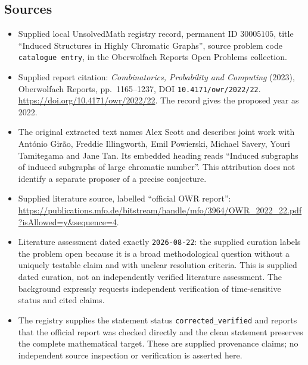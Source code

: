 \documentclass[11pt]{article}
\begin{document}
\subsection{Sources}
\begin{itemize}
\item Supplied local UnsolvedMath registry record, permanent ID \(30005105\), title ``Induced Structures in Highly Chromatic Graphs'', source problem code \texttt{catalogue entry}, in the Oberwolfach Reports Open Problems collection.
\item Supplied report citation: \emph{Combinatorics, Probability and Computing} (2023), Oberwolfach Reports, pp.~1165--1237, DOI \texttt{10.4171/owr/2022/22}. \url{https://doi.org/10.4171/owr/2022/22}. The record gives the proposed year as 2022.
\item The original extracted text names Alex Scott and describes joint work with Ant\'onio Gir\~ao, Freddie Illingworth, Emil Powierski, Michael Savery, Youri Tamitegama and Jane Tan. Its embedded heading reads ``Induced subgraphs of induced subgraphs of large chromatic number''. This attribution does not identify a separate proposer of a precise conjecture.
\item Supplied literature source, labelled ``official OWR report'': \url{https://publications.mfo.de/bitstream/handle/mfo/3964/OWR_2022_22.pdf?isAllowed=y&sequence=4}.
\item Literature assessment dated exactly \texttt{2026-08-22}: the supplied curation labels the problem open because it is a broad methodological question without a uniquely testable claim and with unclear resolution criteria. This is supplied dated curation, not an independently verified literature assessment. The background expressly requests independent verification of time-sensitive status and cited claims.
\item The registry supplies the statement status \texttt{corrected\_verified} and reports that the official report was checked directly and the clean statement preserves the complete mathematical target. These are supplied provenance claims; no independent source inspection or verification is asserted here.
\end{itemize}
\end{document}
